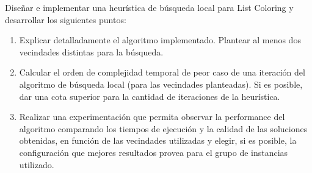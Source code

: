 Diseñar e implementar una heurística de búsqueda local para List Coloring y desarrollar los
siguientes puntos:

\begin{enumerate}
 \item Explicar detalladamente el algoritmo implementado. Plantear al menos dos vecindades distintas
para la búsqueda.
\item Calcular el orden de complejidad temporal de peor caso de una iteración del algoritmo de
búsqueda local (para las vecindades planteadas). Si es posible, dar una cota superior para la
cantidad de iteraciones de la heurística.
\item Realizar una experimentación que permita observar la performance del algoritmo comparando
los tiempos de ejecución y la calidad de las soluciones obtenidas, en función de las vecindades
utilizadas y elegir, si es posible, la configuración que mejores resultados provea para el grupo
de instancias utilizado.

\end{enumerate}
